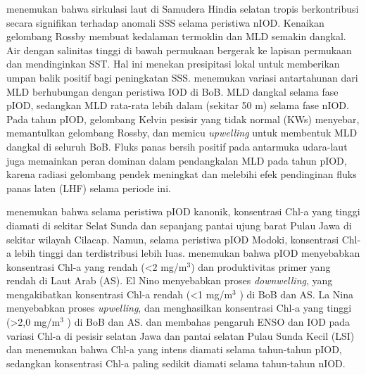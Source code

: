 \begin{spacing}{1.5}
	 menemukan bahwa sirkulasi laut di Samudera Hindia selatan tropis berkontribusi secara signifikan terhadap anomali SSS selama peristiwa nIOD. Kenaikan gelombang Rossby membuat kedalaman termoklin dan MLD semakin dangkal. Air dengan salinitas tinggi di bawah permukaan bergerak ke lapisan permukaan dan mendinginkan SST. Hal ini menekan presipitasi lokal untuk memberikan umpan balik positif bagi peningkatan SSS.  menemukan variasi antartahunan dari MLD berhubungan dengan peristiwa IOD di BoB. MLD dangkal selama fase pIOD, sedangkan MLD rata-rata lebih dalam (sekitar 50 m) selama fase nIOD. Pada tahun pIOD, gelombang Kelvin pesisir yang tidak normal (KWs) menyebar, memantulkan gelombang Rossby, dan memicu \textit{upwelling} untuk membentuk MLD dangkal di seluruh BoB. Fluks panas bersih positif pada antarmuka udara-laut juga memainkan peran dominan dalam pendangkalan MLD pada tahun pIOD, karena radiasi gelombang pendek meningkat dan melebihi efek pendinginan fluks panas laten (LHF) selama periode ini. 
	
	 menemukan bahwa selama peristiwa pIOD kanonik, konsentrasi Chl-a yang tinggi diamati di sekitar Selat Sunda dan sepanjang pantai ujung barat Pulau Jawa di sekitar wilayah Cilacap. Namun, selama peristiwa pIOD Modoki, konsentrasi Chl-a lebih tinggi dan terdistribusi lebih luas.  menemukan bahwa pIOD menyebabkan konsentrasi Chl-a yang rendah (<2 mg/m$^3$) dan produktivitas primer yang rendah di Laut Arab (AS). El Nino menyebabkan proses \textit{downwelling}, yang mengakibatkan konsentrasi Chl-a rendah (<1 mg/m$^3$ ) di BoB dan AS. La Nina menyebabkan proses \textit{upwelling}, dan menghasilkan konsentrasi Chl-a yang tinggi (>2,0 mg/m$^3$ ) di BoB dan AS.  dan  membahas pengaruh ENSO dan IOD pada variasi Chl-a di pesisir selatan Jawa dan pantai selatan Pulau Sunda Kecil (LSI) dan menemukan bahwa Chl-a yang intens diamati selama tahun-tahun pIOD, sedangkan konsentrasi Chl-a paling sedikit diamati selama tahun-tahun nIOD.
	

\end{spacing}
